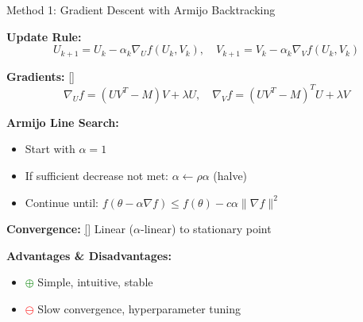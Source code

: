 \documentclass[aspectratio=169,usenames,dvipsnames]{beamer}
\begin{document}
\begin{frame}{Method 1: Gradient Descent with Armijo Backtracking}

\textbf{Update Rule:}
\[
U_{k+1} = U_k - \alpha_k \nabla_U f(U_k, V_k), \quad 
V_{k+1} = V_k - \alpha_k \nabla_V f(U_k, V_k)
\]

\textbf{Gradients:} \hyperlink{app:grad_dense}{[\checkmark]}
\[
\nabla_U f = (UV^T - M)V + \lambda U, \quad
\nabla_V f = (UV^T - M)^T U + \lambda V
\]

\textbf{Armijo Line Search:}
\begin{itemize}
  \item Start with $\alpha = 1$
  \item If sufficient decrease not met: $\alpha \leftarrow \rho \alpha$ (halve)
  \item Continue until: $f(\theta - \alpha \nabla f) \leq f(\theta) - c \alpha \|\nabla f\|^2$
\end{itemize}

\vspace{0.3cm}

\textbf{Convergence:} \hyperlink{app:gd_convergence}{[\checkmark]} Linear ($\alpha$-linear) to stationary point

\vspace{0.3cm}

\textbf{Advantages \& Disadvantages:}
\begin{itemize}
  \item \textcolor{green}{$\oplus$} Simple, intuitive, stable
  \item \textcolor{red}{$\ominus$} Slow convergence, hyperparameter tuning
\end{itemize}

\end{frame}
\end{document}
